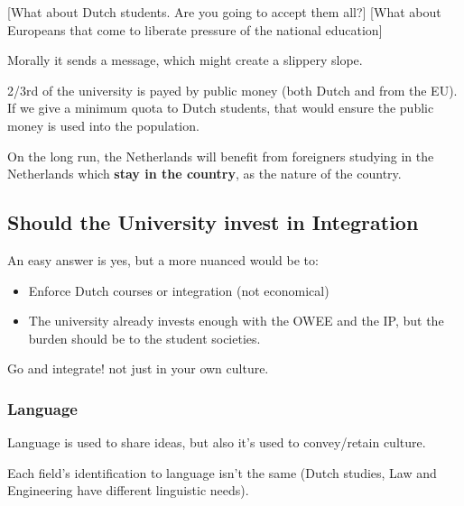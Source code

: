 			[What about Dutch students. Are you going to accept them all?]
			[What about Europeans that come to liberate pressure of the national education]

		Morally it sends a message, which might create a slippery slope.
		
		2/3rd of the university is payed by public money (both Dutch and from the EU). If we give a minimum quota to Dutch students, that would ensure the public money is used into the population.

			On the long run, the Netherlands will benefit from foreigners studying in the Netherlands which \textbf{stay in the country}, as the nature of the country.


	\subsection{Should the University invest in Integration} 

	An easy answer is yes, but a more nuanced would be to:

	\begin{itemize}
		\item Enforce Dutch courses or integration (not economical)
		\item The university already invests enough with the OWEE and the IP, but the burden should be to the student societies.
	\end{itemize}
		
	Go and integrate! not just in your own culture. 


	\subsubsection{Language}

	Language is used to share ideas, but also it's used to convey/retain culture.

	Each field's identification to language isn't the same (Dutch studies, Law and Engineering have different linguistic needs).
